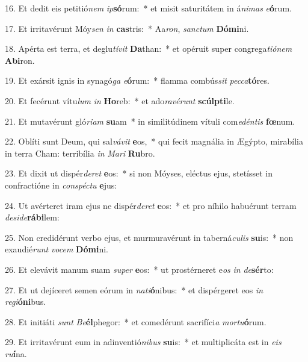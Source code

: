 16. Et dedit eis petitió\textit{nem} \textit{ip}\textbf{só}rum:~*  et misit saturitátem in á\textit{ni}\textit{mas} \textit{e}\textbf{ó}rum.\

17. Et irritavérunt Móy\textit{sen} \textit{in} \textbf{cas}tris:~*  Aa\textit{ron}, \textit{sanc}\textit{tum} \textbf{Dó}\textbf{mi}ni.\

18. Apérta est terra, et deglu\textit{tí}\textit{vit} \textbf{Da}than:~*  et opéruit super congrega\textit{ti}\textit{ó}\textit{nem} \textbf{Ab}\textbf{i}ron.\

19. Et exársit ignis in synagó\textit{ga} \textit{e}\textbf{ó}rum:~*  flamma combús\textit{sit} \textit{pec}\textit{ca}\textbf{tó}res.\

20. Et fecérunt vítu\textit{lum} \textit{in} \textbf{Ho}reb:~*  et ado\textit{ra}\textit{vé}\textit{runt} \textbf{scúlp}\textbf{ti}le.\

21. Et mutavérunt gló\textit{ri}\textit{am} \textbf{su}am~*  in similitúdinem vítuli com\textit{e}\textit{dén}\textit{tis} \textbf{fœ}num.\

22. Oblíti sunt Deum, qui sal\textit{vá}\textit{vit} \textbf{e}os,~*  qui fecit magnália in Ægýpto, mirabília in terra Cham: terribília \textit{in} \textit{Ma}\textit{ri} \textbf{Ru}bro.\

23. Et dixit ut dispér\textit{de}\textit{ret} \textbf{e}os:~*  si non Móyses, eléctus ejus, stetísset in confractióne in \textit{con}\textit{spéc}\textit{tu} \textbf{e}jus:\

24. Ut avérteret iram ejus ne dispér\textit{de}\textit{ret} \textbf{e}os:~*  et pro níhilo habuérunt terram \textit{de}\textit{si}\textit{de}\textbf{rá}\textbf{bi}lem:\

25. Non credidérunt verbo ejus, et murmuravérunt in taberná\textit{cu}\textit{lis} \textbf{su}is:~*  non exaudié\textit{runt} \textit{vo}\textit{cem} \textbf{Dó}\textbf{mi}ni.\

26. Et elevávit manum suam \textit{su}\textit{per} \textbf{e}os:~*  ut prostérneret e\textit{os} \textit{in} \textit{de}\textbf{sér}to:\

27. Et ut dejíceret semen eórum in \textit{na}\textit{ti}\textbf{ó}nibus:~*  et dispérgeret eos \textit{in} \textit{re}\textit{gi}\textbf{ó}\textbf{ni}bus.\

28. Et initiáti \textit{sunt} \textit{Be}\textbf{él}phegor:~*  et comedérunt sacrifíci\textit{a} \textit{mor}\textit{tu}\textbf{ó}rum.\

29. Et irritavérunt eum in adinventió\textit{ni}\textit{bus} \textbf{su}is:~*  et multiplicáta est in \textit{e}\textit{is} \textit{ru}\textbf{í}na.\

